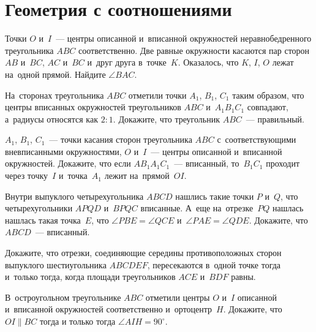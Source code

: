 
\section*{Геометрия с соотношениями}



\begin{problems}

\item
Точки $O$ и~$I$~--- центры описанной и~вписанной окружностей неравнобедренного
треугольника $ABC$ соответственно.
Две равные окружности касаются пар сторон $AB$ и~$BC$, $AC$ и~$BC$ и~друг друга
в~точке~$K$.
Оказалось, что $K$, $I$, $O$ лежат на~одной прямой.
Найдите $\angle BAC$.

\item
На~сторонах треугольника $ABC$ отметили точки $A_1$, $B_1$, $C_1$ таким
образом, что центры вписанных окружностей треугольников $ABC$ и~$A_1 B_1 C_1$
совпадают, а~радиусы относятся как $2 : 1$.
Докажите, что треугольник $ABC$~--- правильный.

\item
$A_1$, $B_1$, $C_1$~--- точки касания сторон треугольника $ABC$
с~соответствующими вневписанными окружностями,
$O$ и~$I$~--- центры описанной и~вписанной окружностей.
Докажите, что если $A B_1 A_1 C_1$~--- вписанный, то~$B_1 C_1$ проходит через
точку~$I$ и~точка~$A_1$ лежит на~прямой~$OI$.

\item
Внутри выпуклого четырехугольника $ABCD$ нашлись такие точки $P$ и~$Q$,
что четырехугольники $APQD$ и~$BPQC$ вписанные.
А~еще на~отрезке~$PQ$ нашлась нашлась такая точка~$E$, что
$\angle PBE = \angle QCE$ и~$\angle PAE = \angle QDE$.
Докажите, что $ABCD$~--- вписанный.

\item
Докажите, что отрезки, соединяющие середины противоположных сторон выпуклого
шестиугольника $ABCDEF$, пересекаются в~одной точке тогда и~только тогда, когда
площади треугольников $ACE$ и~$BDF$ равны.

\item
В~остроугольном треугольнике $ABC$ отметили центры $O$ и~$I$ описанной
и~вписанной окружностей соответственно и~ортоцентр~$H$.
Докажите, что $OI \parallel BC$ тогда и только тогда $\angle AIH = 90^{\circ}$.


\end{problems}
